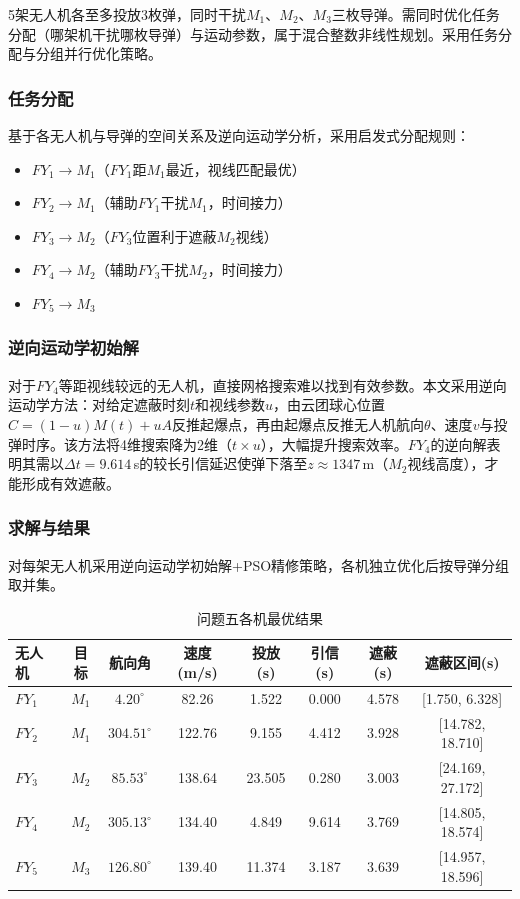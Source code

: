 \documentclass[12pt,a4paper]{article}
\begin{document}
5架无人机各至多投放3枚弹，同时干扰$M_1$、$M_2$、$M_3$三枚导弹。需同时优化任务分配（哪架机干扰哪枚导弹）与运动参数，属于混合整数非线性规划。采用任务分配与分组并行优化策略。

\subsubsection{任务分配}

基于各无人机与导弹的空间关系及逆向运动学分析，采用启发式分配规则：
\begin{itemize}[nosep]
  \item $FY_1 \to M_1$（$FY_1$距$M_1$最近，视线匹配最优）
  \item $FY_2 \to M_1$（辅助$FY_1$干扰$M_1$，时间接力）
  \item $FY_3 \to M_2$（$FY_3$位置利于遮蔽$M_2$视线）
  \item $FY_4 \to M_2$（辅助$FY_3$干扰$M_2$，时间接力）
  \item $FY_5 \to M_3$
\end{itemize}

\subsubsection{逆向运动学初始解}

对于$FY_4$等距视线较远的无人机，直接网格搜索难以找到有效参数。本文采用逆向运动学方法：对给定遮蔽时刻$t$和视线参数$u$，由云团球心位置$C = (1-u)M(t) + uA$反推起爆点，再由起爆点反推无人机航向$\theta$、速度$v$与投弹时序。该方法将4维搜索降为2维（$t \times u$），大幅提升搜索效率。$FY_4$的逆向解表明其需以$\Delta t = 9.614$\,s的较长引信延迟使弹下落至$z \approx 1347$\,m（$M_2$视线高度），才能形成有效遮蔽。

\subsubsection{求解与结果}

对每架无人机采用逆向运动学初始解+PSO精修策略，各机独立优化后按导弹分组取并集。

\begin{table}[H]
\centering
\caption{问题五各机最优结果}
\begin{tabular}{lccccccc}
\toprule
无人机 & 目标 & 航向角 & 速度(m/s) & 投放(s) & 引信(s) & 遮蔽(s) & 遮蔽区间(s) \\
\midrule
$FY_1$ & $M_1$ & $4.20^\circ$ & 82.26 & 1.522 & 0.000 & 4.578 & [1.750, 6.328] \\
$FY_2$ & $M_1$ & $304.51^\circ$ & 122.76 & 9.155 & 4.412 & 3.928 & [14.782, 18.710] \\
$FY_3$ & $M_2$ & $85.53^\circ$ & 138.64 & 23.505 & 0.280 & 3.003 & [24.169, 27.172] \\
$FY_4$ & $M_2$ & $305.13^\circ$ & 134.40 & 4.849 & 9.614 & 3.769 & [14.805, 18.574] \\
$FY_5$ & $M_3$ & $126.80^\circ$ & 139.40 & 11.374 & 3.187 & 3.639 & [14.957, 18.596] \\
\bottomrule
\end{tabular}
\end{table}
\end{document}
